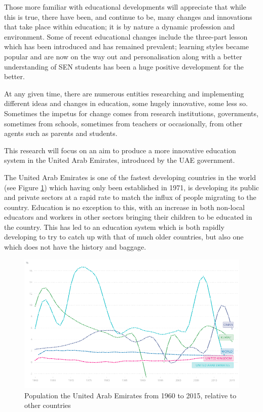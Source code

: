\documentclass[11pt]{article}
\begin{document}
Those more familiar with educational developments will appreciate that while this is true, there have been, and continue to be, many changes and innovations that take place within education; it is by nature a dynamic profession and environment. Some of recent educational changes include the three-part lesson which has been introduced and has remained prevalent; learning styles became popular and are now on the way out \citep{coffield2004should} and personalisation along with a better understanding of SEN students has been a huge positive development for the better.

At any given time, there are numerous entities researching and implementing different ideas and changes in education, some hugely innovative, some less so. Sometimes the impetus for change comes from research institutions, governments, sometimes from schools, sometimes from teachers or occasionally, from other agents such as parents and students. 

This research will focus on an aim to produce a more innovative education system in the United Arab Emirates, introduced by the UAE government.

The United Arab Emirates is one of the fastest developing countries in the world (see Figure \ref{fig:population}) which having only been established in 1971, is developing its public and private sectors at a rapid rate to match the influx of people migrating to the country. Education is no exception to this, with an increase in both non-local educators and workers in other sectors bringing their children to be educated in the country. This has led to an education system which is both rapidly developing to try to catch up with that of much older countries, but also one which does not have the history and baggage. 

\begin{figure}[h]
	\centering
	\captionsetup{justification=centering}
	\includegraphics[scale=0.6]{figures/population}
	\caption{Population the United Arab Emirates from 1960 to 2015, relative to other countries \citep{worldbank}}
	\label{fig:population} 
\end{figure}
\end{document}

